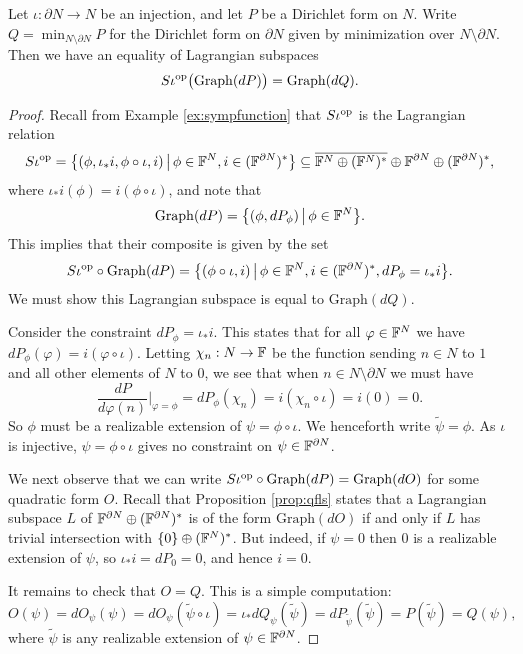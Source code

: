 \begin{theorem} \label{thm:sympmin}
  Let $\iota: \partial N \to N$ be an injection, and let $P$ be a Dirichlet form on
  $N$. Write $Q = \min_{N \setminus \partial N} P$ for the Dirichlet form on
  $\partial N$ given by minimization over $N \setminus \partial N$. Then we have an
  equality of Lagrangian subspaces
  \[
    S\iota^{\mathrm{op}} \big( \mathrm{Graph}(dP)\big) = \mathrm{Graph}(dQ).
  \]
\end{theorem}
\begin{proof}
  Recall from Example \ref{ex:sympfunction} that $S\iota^{\mathrm{op}}$ is the Lagrangian relation
  \[
    S\iota^{\mathrm{op}} = \big\{(\phi, \iota_\ast i,\phi \circ \iota, i) \, \big\vert
      \, \phi \in {\mathbb F}^{N}, i \in ({\mathbb F}^{\partial N})^\ast \big\} \subseteq
      \overline{{\mathbb F}^N \oplus ({\mathbb F}^N)^\ast} \oplus {\mathbb F}^{\partial N} \oplus
      ({\mathbb F}^{\partial N})^\ast,
  \]
  where $\iota_\ast i(\phi) = i(\phi \circ \iota)$, and note that 
  \[
    \mathrm{Graph}(dP) = \big\{(\phi,dP_\phi) \,\big\vert\, \phi \in {\mathbb F}^N\big\}.
  \]
  This implies that their composite is given by the set
  \[
    S\iota^{\mathrm{op}} \circ \mathrm{Graph}(dP) = \big\{(\phi \circ \iota, i)
    \,\big\vert\, \phi \in {\mathbb F}^N, i \in ({\mathbb F}^{\partial N})^\ast, dP_\phi =
  \iota_\ast i \big\}.
  \]
  We must show this Lagrangian subspace is equal to $\mathrm{Graph}(dQ)$.
  
  Consider the constraint $dP_\phi = \iota_\ast i$. This states that for all
  $\varphi \in {\mathbb F}^N$ we have $dP_\phi(\varphi) = i(\varphi\circ \iota)$. Letting
  $\chi_n: N \to {\mathbb F}$ be the function sending $n \in N$ to $1$ and all other
  elements of $N$ to $0$, we see that when $n \in N \setminus \partial N$ we
  must have
  \[
    \frac{dP}{d\varphi(n)}\Bigg\vert_{\varphi = \phi}  = dP_\phi(\chi_n) = 
    i(\chi_n \circ \iota) = i(0) = 0.
  \]
  So $\phi$ must be a realizable extension of $\psi = \phi \circ \iota$. We
  henceforth write $\tilde\psi = \phi$. As $\iota$ is injective, $\psi = \phi
  \circ \iota$ gives no constraint on $\psi \in {\mathbb F}^{\partial N}$. 
 
  We next observe that we can write $S\iota^{\mathrm{op}} \circ \mathrm{Graph}(dP) =
  \mathrm{Graph}(dO)$ for some quadratic form $O$. Recall that Proposition
  \ref{prop:qfls} states that a Lagrangian subspace $L$ of ${\mathbb F}^{\partial N}
  \oplus ({\mathbb F}^{\partial N})^\ast$ is of the form $\mathrm{Graph}(dO)$ if and only
  if $L$ has trivial intersection with $\{0\} \oplus ({\mathbb F}^N)^\ast$. But indeed,
  if $\psi = 0$ then $0$ is a realizable extension of $\psi$, so $\iota_\ast i =
  dP_0 = 0$, and hence $i = 0$. 
  
  It remains to check that $O = Q$. This is a simple computation:
  \[
    O(\psi) = dO_\psi(\psi) = dO_\psi(\tilde\psi \circ \iota) = \iota_\ast
    dQ_\psi(\tilde\psi) = dP_{\tilde\psi}(\tilde\psi) = P(\tilde\psi) = Q(\psi),
  \]
  where $\tilde\psi$ is any realizable extension of $\psi \in {\mathbb F}^{\partial N}$.
\end{proof}

